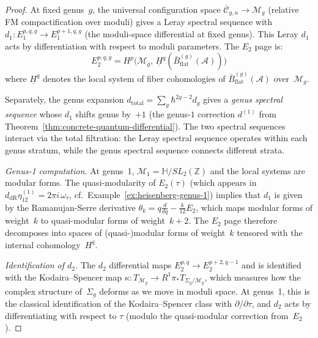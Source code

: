 \begin{proof}
At fixed genus~$g$, the universal configuration space
$\overline{\mathcal{C}}_{g,n} \to \mathcal{M}_g$ (relative FM
compactification over moduli) gives a Leray spectral sequence
with $d_1: E_1^{p,q,g} \to E_1^{p+1,q,g}$ (the moduli-space differential
at fixed genus). This Leray $d_1$ acts by differentiation with respect
to moduli parameters. The $E_2$ page is:
\[
E_2^{p,q,g}
=H^p\bigl(\mathcal{M}_g,\,
\underline{H}^q(\bar{B}^{(g)}_{\mathrm{flat}}(\mathcal A))\bigr)
\]
where $\underline{H}^q$ denotes the local system of fiber
cohomologies of
$\bar{B}^{(g)}_{\mathrm{flat}}(\mathcal A)$ over~$\mathcal{M}_g$.

Separately, the genus expansion $d_{\mathrm{total}} = \sum_g \hbar^{2g-2} d_g$
gives a \emph{genus spectral sequence} whose $d_1$ shifts genus by~$+1$
(the genus-$1$ correction $d^{(1)}$ from
Theorem~\ref{thm:concrete-quantum-differential}). The two spectral
sequences interact via the total filtration: the Leray spectral
sequence operates within each genus stratum, while the genus spectral
sequence connects different strata.

\emph{Genus-1 computation.}
At genus~1, $\mathcal{M}_1 = \mathbb{H}/SL_2(\mathbb{Z})$ and the local systems are modular forms. The quasi-modularity of $E_2(\tau)$ (which appears in $d_{\mathrm{dR}}\eta_{12}^{(1)} = 2\pi i\, \omega_\tau$, cf.\ Example~\ref{ex:heisenberg-genus-1}) implies that $d_1$ is given by the Ramanujan-Serre derivative $\theta_k = q\frac{d}{dq} - \frac{k}{12}E_2$, which maps modular forms of weight~$k$ to quasi-modular forms of weight~$k+2$. The $E_2$ page therefore decomposes into spaces of (quasi-)modular forms of weight~$k$ tensored with the internal cohomology~$H^q$.

\emph{Identification of $d_2$.}
The $d_2$ differential maps $E_2^{p,q} \to E_2^{p+2,q-1}$ and is identified with the Kodaira--Spencer map $\kappa: T_{\mathcal{M}_g} \to R^1\pi_* T_{\Sigma_g/\mathcal{M}_g}$, which measures how the complex structure of~$\Sigma_g$ deforms as we move in moduli space. At genus~1, this is the classical identification of the Kodaira--Spencer class with $\partial/\partial\tau$, and $d_2$ acts by differentiating with respect to $\tau$ (modulo the quasi-modular correction from~$E_2$).
\end{proof}



